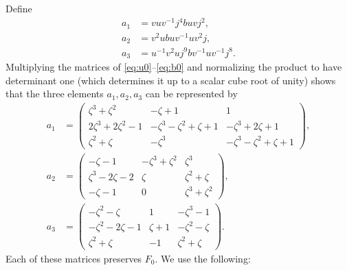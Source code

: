 \documentclass[11pt]{amsart}
\theoremstyle{definition}
\theoremstyle{remark}
\begin{document}
Define
\begin{align}
 a_1&=vuv^{-1}j^4buvj^2,\\
 a_2&=v^2ubuv^{-1}uv^2j,\\
 a_3&=u^{-1}v^2uj^9bv^{-1}uv^{-1}j^8.
\end{align}
Multiplying the matrices of \eqref{eq:u0}--\eqref{eq:b0} and normalizing the
product to have determinant one (which determines it up to a scalar cube root
of unity) shows that the three elements $a_1,a_2,a_3$ can be represented by
\begin{align}
 a_1&=
 \begin{pmatrix}
 \zeta^3+\zeta^2    &-\zeta+1                &1\\
 2\zeta^3+2\zeta^2-1&-\zeta^3-\zeta^2+\zeta+1&-\zeta^3+2\zeta+1\\
 \zeta^2+\zeta      &-\zeta^3                &-\zeta^3-\zeta^2+\zeta+1
 \end{pmatrix},\label{eq:a1-matrix}\\[3pt]
 a_2&=
 \begin{pmatrix}
 -\zeta-1        &-\zeta^3+\zeta^2&\zeta^3\\
 \zeta^3-2\zeta-2&\zeta           &\zeta^2+\zeta\\
 -\zeta-1        &0               &\zeta^3+\zeta^2
 \end{pmatrix},\label{eq:a2-matrix}\\[3pt]
 a_3&=
 \begin{pmatrix}
 -\zeta^2-\zeta   &1      &-\zeta^3-1\\
 -\zeta^2-2\zeta-1&\zeta+1&-\zeta^2-\zeta\\
 \zeta^2+\zeta    &-1     &\zeta^2+\zeta
 \end{pmatrix}.\label{eq:a3-matrix}
\end{align}
Each of these matrices preserves $F_0$.
We use the following:
\end{document}
